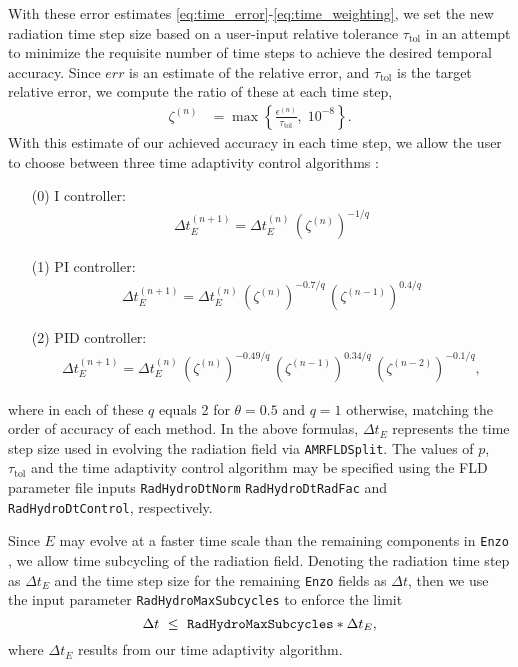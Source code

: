 \documentclass[letterpaper,10pt]{article}
\renewcommand{\(}{\left(}
\renewcommand{\)}{\right)}
\newcommand{\dt}{\Delta t}
\newcommand{\enzo}{{\tt Enzo} }
\begin{document}
With these error estimates
\eqref{eq:time_error}-\eqref{eq:time_weighting}, we set the new
radiation time step size based on a user-input relative tolerance
$\tau_{\text{tol}}$ in an attempt to minimize the requisite number of
time steps to achieve the desired temporal accuracy.  Since $err$ is
an estimate of the relative error, and $\tau_{\text{tol}}$ is the
target relative error, we compute the ratio of these at each time
step,
\begin{align}
  \label{eq:time_accuracy}
  \zeta^{(n)} &= \max\left\{\frac{\epsilon^{(n)}}{\tau_{\text{tol}}},\; 10^{-8} \right\}.
\end{align}
With this estimate of our achieved accuracy in each time step, we
allow the user to choose between three time adaptivity control
algorithms \cite{KennedyCarpenter2003}:
\begin{itemize}
\item[(0)] I controller: 
  \begin{align}
    \label{eq:time_estimateI}
    \dt_E^{(n+1)} = \dt_E^{(n)}\, \(\zeta^{(n)}\)^{-1/q}
  \end{align}
\item[(1)] PI controller:
  \begin{align}
    \label{eq:time_estimatePI}
    \dt_E^{(n+1)} = \dt_E^{(n)}\, \(\zeta^{(n)}\)^{-0.7/q}\, \(\zeta^{(n-1)}\)^{0.4/q}
  \end{align}
\item[(2)] PID controller:
  \begin{align}
    \label{eq:time_estimatePID}
    \dt_E^{(n+1)} = \dt_E^{(n)}\, \(\zeta^{(n)}\)^{-0.49/q}\, \(\zeta^{(n-1)}\)^{0.34/q}\, \(\zeta^{(n-2)}\)^{-0.1/q},
  \end{align}
\end{itemize}
where in each of these $q$ equals 2 for $\theta=0.5$ and $q=1$
otherwise, matching the order of accuracy of each method.  In the
above formulas, $\dt_E$ represents the time step size used in evolving
the radiation field via {\tt AMRFLDSplit}.  The values of $p$,
$\tau_{\text{tol}}$ and the time adaptivity control algorithm may be
specified using the FLD parameter file inputs {\tt RadHydroDtNorm} 
{\tt RadHydroDtRadFac} and {\tt RadHydroDtControl}, respectively.

Since $E$ may evolve at a faster time scale than the remaining
components in \enzo, we allow time subcycling of the radiation field.
Denoting the radiation time step as $\dt_{E}$ and the time step size
for the remaining \enzo fields as $\dt$, then we use the input
parameter {\tt RadHydroMaxSubcycles} to enforce the limit
\[
  \dt \ \le \ \text{\tt RadHydroMaxSubcycles} * \dt_E,
\]
where $\dt_E$ results from our time adaptivity algorithm.  
\end{document}
